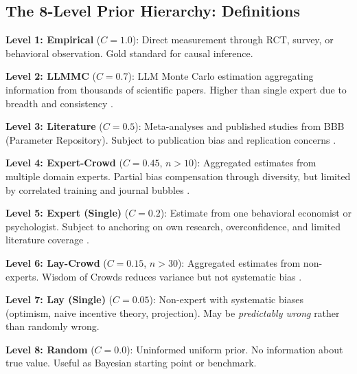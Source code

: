 \subsection{The 8-Level Prior Hierarchy: Definitions}
\label{sec:ie-prior-hierarchy}

\begin{tcolorbox}[colback=blue!5!white, colframe=blue!75!black,
    title=\textbf{Definition IE-D2: The 8-Level Prior Hierarchy}]

\textbf{Level 1: Empirical} ($C = 1.0$): Direct measurement through RCT, survey, or behavioral observation. Gold standard for causal inference.

\textbf{Level 2: LLMMC} ($C = 0.7$): LLM Monte Carlo estimation aggregating information from thousands of scientific papers. Higher than single expert due to breadth and consistency \citep{zhu2024eliciting, scientificreports2025llmpriors}.

\textbf{Level 3: Literature} ($C = 0.5$): Meta-analyses and published studies from BBB (Parameter Repository). Subject to publication bias and replication concerns \citep{camerer2016evaluating}.

\textbf{Level 4: Expert-Crowd} ($C = 0.45$, $n > 10$): Aggregated estimates from multiple domain experts. Partial bias compensation through diversity, but limited by correlated training and journal bubbles \citep{kahneman2015noise}.

\textbf{Level 5: Expert (Single)} ($C = 0.2$): Estimate from one behavioral economist or psychologist. Subject to anchoring on own research, overconfidence, and limited literature coverage \citep{dellavigna2016predict}.

\textbf{Level 6: Lay-Crowd} ($C = 0.15$, $n > 30$): Aggregated estimates from non-experts. Wisdom of Crowds reduces variance but not systematic bias \citep{surowiecki2004wisdom}.

\textbf{Level 7: Lay (Single)} ($C = 0.05$): Non-expert with systematic biases (optimism, naive incentive theory, projection). May be \textit{predictably wrong} rather than randomly wrong.

\textbf{Level 8: Random} ($C = 0.0$): Uninformed uniform prior. No information about true value. Useful as Bayesian starting point or benchmark.

\end{tcolorbox}

